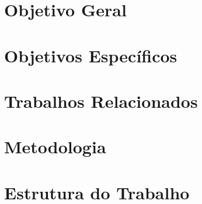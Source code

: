     \section{Objetivo Geral}


    \section{Objetivos Específicos}



    \section{Trabalhos Relacionados}


    \section{Metodologia}
        

    \section{Estrutura do Trabalho}
       